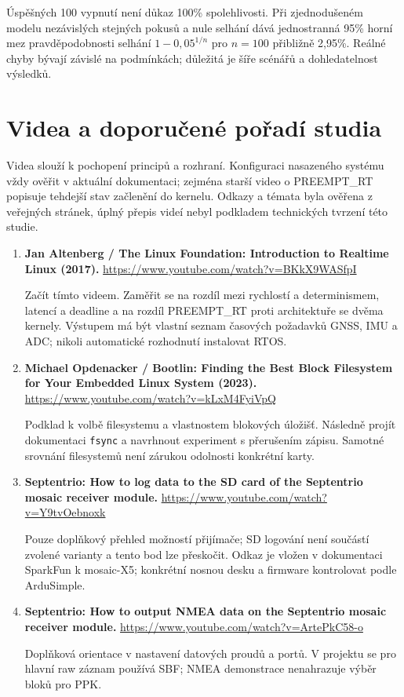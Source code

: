\documentclass[11pt,a4paper]{article}
\newcommand{\novastrana}{\clearpage}
\begin{document}
Úspěšných 100 vypnutí není důkaz 100\% spolehlivosti. Při zjednodušeném modelu nezávislých stejných pokusů a nule selhání dává jednostranná 95\% horní mez pravděpodobnosti selhání $1-0{,}05^{1/n}$ pro $n=100$ přibližně 2,95\%. Reálné chyby bývají závislé na podmínkách; důležitá je šíře scénářů a dohledatelnost výsledků.

\novastrana
\section{Videa a doporučené pořadí studia}
Videa slouží k pochopení principů a rozhraní. Konfiguraci nasazeného systému vždy ověřit v aktuální dokumentaci; zejména starší video o PREEMPT\_RT popisuje tehdejší stav začlenění do kernelu. Odkazy a témata byla ověřena z veřejných stránek, úplný přepis videí nebyl podkladem technických tvrzení této studie.

\begin{enumerate}
\item \textbf{Jan Altenberg / The Linux Foundation: Introduction to Realtime Linux (2017).}
\url{https://www.youtube.com/watch?v=BKkX9WASfpI}

Začít tímto videem. Zaměřit se na rozdíl mezi rychlostí a determinismem, latencí a deadline a na rozdíl PREEMPT\_RT proti architektuře se dvěma kernely. Výstupem má být vlastní seznam časových požadavků GNSS, IMU a ADC; nikoli automatické rozhodnutí instalovat RTOS.\cite{videoRT}

\item \textbf{Michael Opdenacker / Bootlin: Finding the Best Block Filesystem for Your Embedded Linux System (2023).}
\url{https://www.youtube.com/watch?v=kLxM4FyiVpQ}

Podklad k volbě filesystemu a vlastnostem blokových úložišť. Následně projít dokumentaci \texttt{fsync} a navrhnout experiment s přerušením zápisu. Samotné srovnání filesystemů není zárukou odolnosti konkrétní karty.\cite{videoFS,fsync}

\item \textbf{Septentrio: How to log data to the SD card of the Septentrio mosaic receiver module.}
\url{https://www.youtube.com/watch?v=Y9tvOebnoxk}

Pouze doplňkový přehled možností přijímače; SD logování není součástí zvolené varianty a tento bod lze přeskočit. Odkaz je vložen v dokumentaci SparkFun k mosaic-X5; konkrétní nosnou desku a firmware kontrolovat podle ArduSimple.\cite{videosMosaic,ardusimple}

\item \textbf{Septentrio: How to output NMEA data on the Septentrio mosaic receiver module.}
\url{https://www.youtube.com/watch?v=ArtePkC58-o}

Doplňková orientace v nastavení datových proudů a portů. V projektu se pro hlavní raw záznam používá SBF; NMEA demonstrace nenahrazuje výběr bloků pro PPK.\cite{videosMosaic}
\end{enumerate}
\end{document}
